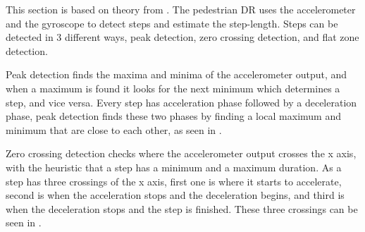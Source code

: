 This section is based on theory from \citep{misc:PedestrianDeadReckoningSystem}.
The pedestrian DR uses the accelerometer and the gyroscope to detect steps and estimate the step-length.
Steps can be detected in 3 different ways, peak detection, zero crossing detection, and flat zone detection.

Peak detection finds the maxima and minima of the accelerometer output, and when a maximum is found it looks for the next minimum which determines a step, and vice versa. 
Every step has acceleration phase followed by a deceleration phase, peak detection finds these two phases by finding a local maximum and minimum that are close to each other, as seen in .

Zero crossing detection checks where the accelerometer output crosses the x axis, with the heuristic that a step has a minimum and a maximum duration. 
As a step has three crossings of the x axis, first one is where it starts to accelerate, second is when the acceleration stops and the deceleration begins, and third is when the deceleration stops and the step is finished. 
These three crossings can be seen in .

